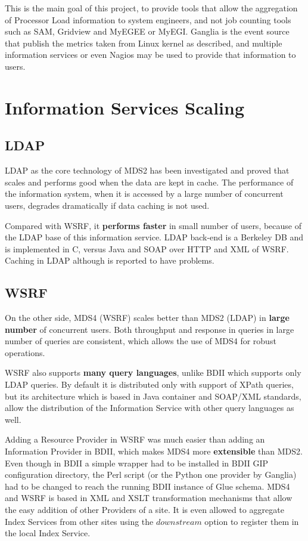 This is the main goal of this project, to provide tools that allow the aggregation of Processor Load information to system engineers, and not job counting tools such as SAM, Gridview and MyEGEE or MyEGI. Ganglia is the event source that publish the metrics taken from Linux kernel as described, and multiple information services or even Nagios may be used to provide that information to users.

\section{Information Services Scaling}

\subsection{LDAP}

LDAP as the core technology of MDS2 has been investigated \cite{zhang2004performance} and proved that scales and performs good when the data are kept in cache. The performance of the information system, when it is accessed by a large number of concurrent users, degrades dramatically if data caching is not used.

Compared with WSRF, it {\bf performs faster} \cite{schopf2006monitoring} in small number of users, because of the LDAP base of this information service. LDAP back-end is a Berkeley DB and is implemented in C, versus Java and SOAP over HTTP and XML of WSRF. Caching in LDAP although is reported to have problems.

\subsection{WSRF}

On the other side, MDS4 (WSRF) scales better than MDS2 (LDAP) in {\bf large number} of concurrent users. Both throughput and response in queries in large number of queries are consistent, which allows the use of MDS4 for robust operations.

WSRF also supports {\bf many query languages}, unlike BDII which supports only LDAP queries. By default it is distributed only with support of XPath queries, but its architecture which is based in Java container and SOAP/XML standards, allow the distribution of the Information Service with other query languages as well.

Adding a Resource Provider in WSRF was much easier than adding an Information Provider in BDII, which makes MDS4 more {\bf extensible} than MDS2. Even though in BDII a simple wrapper had to be installed in BDII GIP configuration directory, the Perl script (or the Python one provider by Ganglia) had to be changed to reach the running BDII instance of Glue schema. MDS4 and WSRF is based in XML and XSLT transformation mechanisms that allow the easy addition of other Providers of a site. It is even allowed to aggregate Index Services from other sites using the $downstream$ option to register them in the local Index Service.

